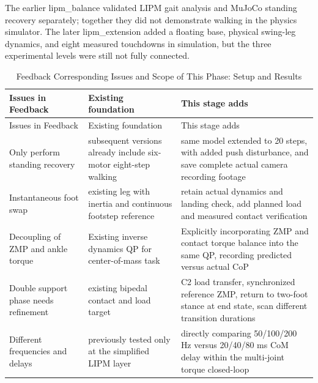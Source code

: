 The earlier lipm\_balance validated LIPM gait analysis and MuJoCo standing recovery separately; together they did not demonstrate walking in the physics simulator. The later lipm\_extension added a floating base, physical swing-leg dynamics, and eight measured touchdowns in simulation, but the three experimental levels were still not fully connected.

\FloatBarrier\begingroup\small\setlength{\tabcolsep}{2.5pt}
\begin{longtable}[]{@{}
  >{\raggedright\arraybackslash}p{}
  >{\raggedright\arraybackslash}p{}
  >{\raggedright\arraybackslash}p{}@{}}
\caption{Feedback Corresponding Issues and Scope of This Phase: Setup and Results}\label{tab:s22-1}\tabularnewline
\toprule\noalign{}
\begin{minipage}[b]{\linewidth}\raggedright
Issues in Feedback
\end{minipage} & \begin{minipage}[b]{\linewidth}\raggedright
Existing foundation
\end{minipage} & \begin{minipage}[b]{\linewidth}\raggedright
This stage adds
\end{minipage} \\
\midrule\noalign{}
\endfirsthead
\toprule\noalign{}
\begin{minipage}[b]{\linewidth}\raggedright
Issues in Feedback
\end{minipage} & \begin{minipage}[b]{\linewidth}\raggedright
Existing foundation
\end{minipage} & \begin{minipage}[b]{\linewidth}\raggedright
This stage adds
\end{minipage} \\
\midrule\noalign{}
\endhead
\bottomrule\noalign{}
\endlastfoot
Only perform standing recovery & subsequent versions already include six-motor eight-step walking & same model extended to 20 steps, with added push disturbance, and save complete actual camera recording footage \\
Instantaneous foot swap & existing leg with inertia and continuous footstep reference & retain actual dynamics and landing check, add planned load and measured contact verification \\
Decoupling of ZMP and ankle torque & Existing inverse dynamics QP for center-of-mass task & Explicitly incorporating ZMP and contact torque balance into the same QP, recording predicted versus actual CoP \\
Double support phase needs refinement & existing bipedal contact and load target & C2 load transfer, synchronized reference ZMP, return to two-foot stance at end state, scan different transition durations \\
Different frequencies and delays & previously tested only at the simplified LIPM layer & directly comparing 50/100/200 Hz versus 20/40/80 ms CoM delay within the multi-joint torque closed-loop \\
\end{longtable}\endgroup

